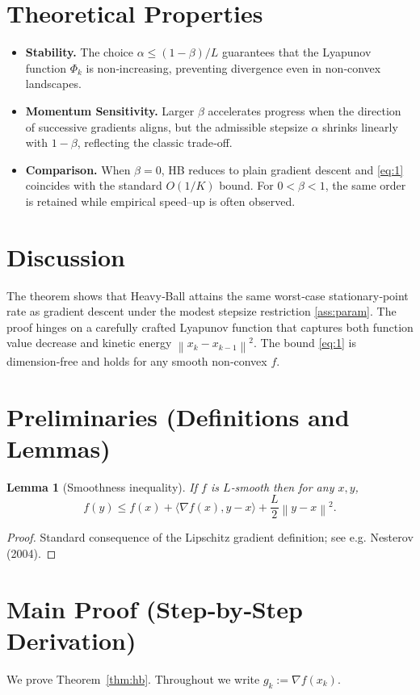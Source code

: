 \documentclass{article}
\newtheorem{lemma}{Lemma}
\newcommand{\norm}[1]{\left\|#1\right\|}
\begin{document}
\section*{Theoretical Properties}
\begin{itemize}[leftmargin=*]
\item \textbf{Stability.} The choice $\alpha\le(1-\beta)/L$ guarantees that the Lyapunov function $\Phi_k$ is non‑increasing, preventing divergence even in non‑convex landscapes.
\item \textbf{Momentum Sensitivity.} Larger $\beta$ accelerates progress when the direction of successive gradients aligns, but the admissible stepsize $\alpha$ shrinks linearly with $1-\beta$, reflecting the classic trade‑off.
\item \textbf{Comparison.} When $\beta=0$, HB reduces to plain gradient descent and \eqref{eq:1} coincides with the standard $O(1/K)$ bound. For $0<\beta<1$, the same order is retained while empirical speed–up is often observed.
\end{itemize}

\section*{Discussion}
The theorem shows that Heavy‑Ball attains the same worst‑case stationary‑point rate as gradient descent under the modest stepsize restriction \eqref{ass:param}. The proof hinges on a carefully crafted Lyapunov function that captures both function value decrease and kinetic energy $\norm{x_k-x_{k-1}}^{2}$. The bound \eqref{eq:1} is dimension‑free and holds for any smooth non‑convex $f$.

\newpage
\section*{Preliminaries (Definitions and Lemmas)}
\begin{lemma}[Smoothness inequality]\label{lem:smooth}
If $f$ is $L$‑smooth then for any $x,y$,
\[
f(y)\le f(x)+\langle\nabla f(x),y-x\rangle+\frac{L}{2}\norm{y-x}^{2}.
\]
\end{lemma}
\begin{proof}
Standard consequence of the Lipschitz gradient definition; see e.g. Nesterov (2004). \qedhere
\end{proof}

\section*{Main Proof (Step‑by‑Step Derivation)}
We prove Theorem~\ref{thm:hb}. Throughout we write $g_k:=\nabla f(x_k)$.
\end{document}
